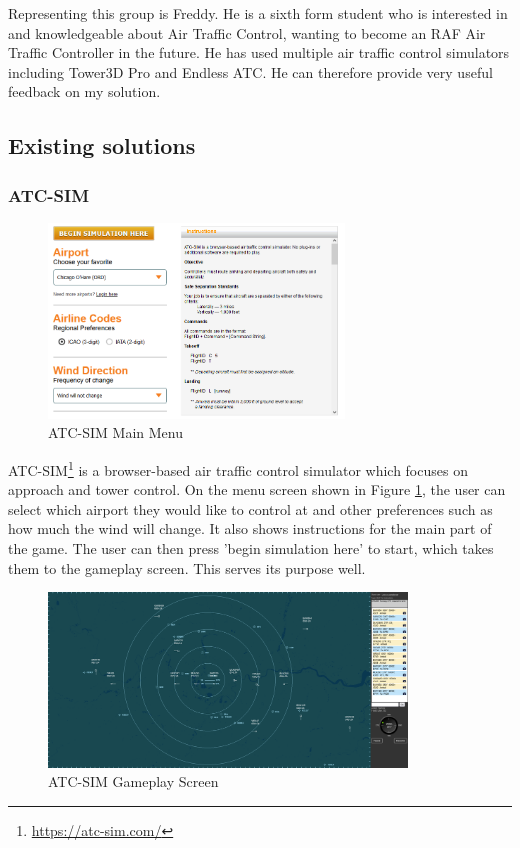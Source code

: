 \documentclass{article}
\begin{document}
Representing this group is Freddy.
He is a sixth form student who is interested in and knowledgeable about Air Traffic Control, wanting to become an RAF Air Traffic Controller in the future.
He has used multiple air traffic control simulators including Tower3D Pro and Endless ATC.
He can therefore provide very useful feedback on my solution.


\subsection{Existing solutions} \label{existingsolutions}
\subsubsection{ATC-SIM} \label{atc-sim}
\begin{figure}[H]
\centering
\includegraphics[width=0.7\textwidth]{existing_solutions/atcsimmenu.png}
\caption{\label{fig:atcsimmenu}ATC-SIM Main Menu}
\end{figure}
ATC-SIM\footnote{\url{https://atc-sim.com/}} is a browser-based air traffic control simulator which focuses on approach and tower control.
On the menu screen shown in Figure \ref{fig:atcsimmenu}, the user can select which airport they would like to control at and other preferences such as how much the wind will change.
It also shows instructions for the main part of the game.
The user can then press 'begin simulation here' to start, which takes them to the gameplay screen.
This serves its purpose well.
\begin{figure}[H]
\centering
\includegraphics[width=0.85\textwidth]{existing_solutions/atcsim1.png}
\caption{\label{fig:atcsim1}ATC-SIM Gameplay Screen}
\end{figure}
\end{document}
